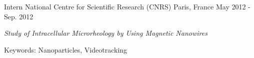\begin{cventries}
  \cventry
    {Intern} %
    {National Centre for Scientific Research (CNRS)} %
    {Paris, France} %
    {May 2012 - Sep. 2012} %
    {
      \begin{cvitems} %
        \item {\textit{Study of Intracellular Microrheology by Using Magnetic Nanowires} \hyperlink{SKD+14}{\honordatestyle{[SKD+14]}}}
        \item {Keywords: Nanoparticles, Videotracking}
      \end{cvitems}
    }

%

\end{cventries}

